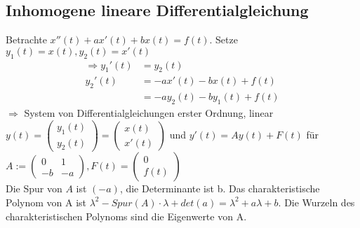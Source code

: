\documentclass[12pt,a4paper]{article}
\newcommand{\DGL}{Differentialgleichung }
\newcommand{\DGLs}{Differentialgleichungen }
\begin{document}
\subsection{Inhomogene lineare \DGL}
Betrachte $x''(t) + ax'(t) +bx(t) = f(t)$. Setze $y_1(t) = x(t), y_2(t) = x'(t)$
\begin{align*}
\Rightarrow y_1'(t) &= y_2(t) \\
y_2'(t) &= -ax'(t)-bx(t)+f(t) \\
&= -ay_2(t)-by_1(t)+f(t)
\end{align*}
$\Rightarrow$ System von \DGLs erster Ordnung, linear \\
$y(t) = \begin{pmatrix}
y_1(t) \\
y_2(t)
\end{pmatrix} = \begin{pmatrix}
x(t) \\
x'(t)
\end{pmatrix} $ und $y'(t) = Ay(t) + F(t)$ für $A:= \begin{pmatrix}
0 & 1 \\
-b & -a
\end{pmatrix}, F(t) = \begin{pmatrix}
0 \\
f(t)
\end{pmatrix}$ \\
Die Spur von $A$ ist $(-a)$, die Determinante ist b. Das charakteristische Polynom von A ist $\lambda^2-Spur(A) \cdot \lambda + det(a) = \lambda^2+a\lambda+b$. Die Wurzeln des charakteristischen Polynoms sind die Eigenwerte von A.
\end{document}
